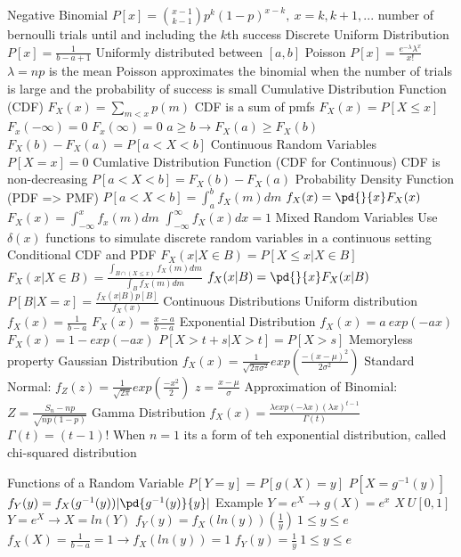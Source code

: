 \documentclass[14pt]{extarticle}
\begin{document}
\begin{outline}
			\2	Negative Binomial
				\3	$P[x] = \binom{x-1}{k-1}p^k(1-p)^{x-k},~x=k,k+1,...$
				\3	number of bernoulli trials until and including the $k$th success
			\2	Discrete Uniform Distribution
				\3	$P[x] = \frac{1}{b - a + 1}$
				\3	Uniformly distributed between $[a,b]$
			\2	Poisson
				\3	$P[x] = \frac{e^{-\lambda}\lambda^x}{x!}$
				\3	$\lambda = np$ is the mean
				\3	Poisson approximates the binomial when the number of trials is large
						and the probability of success is small
		\1	Cumulative Distribution Function (CDF)
			\2	$F_X(x) = \sum_{m < x}p(m)$
				\3	CDF is a sum of pmfs
			\2	$F_X(x) = P[X \le x]$
			\2	$F_x(-\infty) = 0$
			\2	$F_x(\infty) = 0$
			\2	$a \ge b \rightarrow F_X(a) \ge F_X(b)$
			\2	$F_X(b) - F_X(a) = P[a < X < b]$
		\1	Continuous Random Variables
			\2	$P[X = x] = 0$
			\2	Cumlative Distribution Function (CDF for Continuous)
				\3	CDF is non-decreasing
				\3	$P[a < X < b] = F_X(b) - F_X(a)$
			\2	Probability Density Function (PDF => PMF)
				\3 $P[a < X < b] = \int_a^b f_X(m) dm$
				\3	$f_X(x) = \pd{}{x}F_X(x)$
				\3	$F_X(x) = \int_{-\infty}^x f_x(m)dm$
				\3	$\int_{-\infty}^{\infty} f_X(x) dx = 1$
		\1	Mixed Random Variables
			\2	Use $\delta(x)$ functions to simulate discrete random variables in a
					continuous setting
		\1	Conditional CDF and PDF
			\2	$F_X(x | X \in B) = P[X \le x | X \in B]$
			\2	$F_X(x | X \in B) = \frac{\int_{B \cap (X \le x)}f_X(m) dm}{\int_B f_X(m) dm}$
			\2	$f_X(x | B) = \pd{}{x}F_X(x | B)$
			\2	$P[B | X = x] = \frac{f_X(x | B)p[B]}{f_X(x)}$
		\1	Continuous Distributions
			\2	Uniform distribution
				\3	$f_X(x) = \frac{1}{b-a}$
				\3	$F_X(x) = \frac{x - a}{b-a}$
			\2	Exponential Distribution
				\3	$f_X(x) = a~exp(-ax)$
				\3	$F_X(x) = 1 - exp(-ax)$
				\3	$P[X > t + s | X > t] = P[X > s]$
					\4	Memoryless property
			\2	Gaussian Distribution
				\3	$f_X(x) = \frac{1}{\sqrt{2\pi \sigma^2}}exp(\frac{-(x - \mu)^2}{2\sigma^2})$
				\3	Standard Normal:	$f_Z(z) = \frac{1}{\sqrt{2\pi}}exp(\frac{-x^2}{2})$
					\4	$z = \frac{x - \mu}{\sigma}$
					\4	Approximation of Binomial:	$Z = \frac{S_n - np}{\sqrt{np(1-p)}}$
			\2	Gamma Distribution
				\3	$f_X(x) = \frac{\lambda exp(-\lambda x) (\lambda x)^{t-1}}{\Gamma (t)}$
					\4	$\Gamma(t) = (t-1)!$
					\4	When $n = 1$ its a form of teh exponential distribution, called chi-squared distribution
		
		\1	Functions of a Random Variable
			\2	$P[Y = y] = P[g(X) = y]$
			\2	$P[X = g^{-1}(y)]$
			\2	$f_Y(y) = f_X(g^{-1}(y)) |\pd{g^{-1}(y)}{y}|$
			\2	Example
				\3	$Y = e^X \rightarrow g(X) = e^x$
				\3	$X ~ U[0,1]$
				\3	$Y = e^X \rightarrow X = ln(Y)$
				\3	$f_Y(y) = f_X(ln(y)) (\frac{1}{y})~1 \le y \le e$
				\3	$f_X(X) = \frac{1}{b - a} = 1 \rightarrow f_X(ln(y)) = 1$
				\3	$f_Y(y) = \frac{1}{y}~1 \le y \le e$
		

\end{outline}
\end{document}
